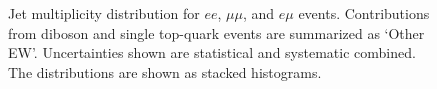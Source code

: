 \begin{figure}[htbp]
  \begin{center}
    \caption{ Jet multiplicity distribution for $ee$, $\mu\mu$, and $e\mu$ events.
      Contributions from diboson and single top-quark events are summarized as `Other EW'.
      Uncertainties shown are statistical and systematic combined.
      The distributions are shown as stacked histograms.}
    \label{f:ll_njets}
  \end{center}
\end{figure}

